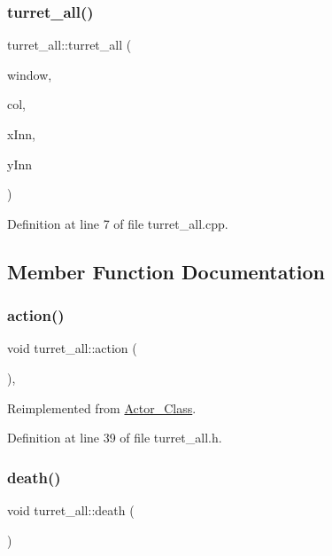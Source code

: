 \subsubsection{\texorpdfstring{turret\+\_\+all()}{turret\_all()}}
{\footnotesize\ttfamily turret\+\_\+all\+::turret\+\_\+all (\begin{DoxyParamCaption}\item[{sf\+::\+Render\+Window \&}]{window,  }\item[{\hyperlink{class_collision}{Collision}}]{col,  }\item[{int}]{x\+Inn,  }\item[{int}]{y\+Inn }\end{DoxyParamCaption})}



Definition at line 7 of file turret\+\_\+all.\+cpp.



\subsection{Member Function Documentation}
\hypertarget{classturret__all_a448418831d26b665611848751d6294b6}{}\label{classturret__all_a448418831d26b665611848751d6294b6} 
\subsubsection{\texorpdfstring{action()}{action()}}
{\footnotesize\ttfamily void turret\+\_\+all\+::action (\begin{DoxyParamCaption}{ }\end{DoxyParamCaption})\hspace{0.3cm}{\ttfamily [inline]}, {\ttfamily [virtual]}}



Reimplemented from \hyperlink{class_actor___class_ab8e23ffae108da3b8eda67c6753bdae0}{Actor\+\_\+\+Class}.



Definition at line 39 of file turret\+\_\+all.\+h.

\hypertarget{classturret__all_ae43c3ac8bb96e81158de74944fe58010}{}\label{classturret__all_ae43c3ac8bb96e81158de74944fe58010} 
\subsubsection{\texorpdfstring{death()}{death()}}
{\footnotesize\ttfamily void turret\+\_\+all\+::death (\begin{DoxyParamCaption}{ }\end{DoxyParamCaption})\hspace{0.3cm}{\ttfamily [virtual]}}



